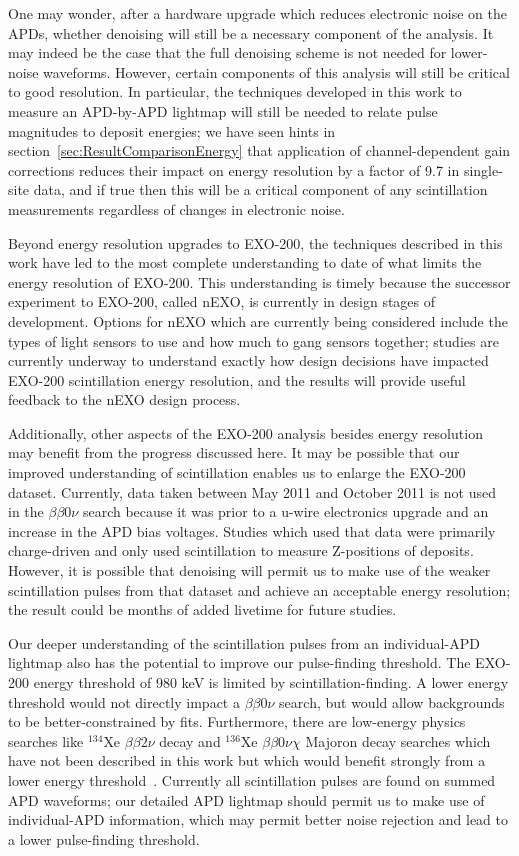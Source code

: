 One may wonder, after a hardware upgrade which reduces electronic noise on the APDs, whether denoising will still be a necessary component of the analysis.  It may indeed be the case that the full denoising scheme is not needed for lower-noise waveforms.  However, certain components of this analysis will still be critical to good resolution.  In particular, the techniques developed in this work to measure an APD-by-APD lightmap will still be needed to relate pulse magnitudes to deposit energies; we have seen hints in section~\ref{sec:ResultComparisonEnergy} that application of channel-dependent gain corrections reduces their impact on energy resolution by a factor of 9.7 in single-site data, and if true then this will be a critical component of any scintillation measurements regardless of changes in electronic noise.

Beyond energy resolution upgrades to EXO-200, the techniques described in this work have led to the most complete understanding to date of what limits the energy resolution of EXO-200.  This understanding is timely because the successor experiment to EXO-200, called nEXO, is currently in design stages of development.  Options for nEXO which are currently being considered include the types of light sensors to use and how much to gang sensors together; studies are currently underway to understand exactly how design decisions have impacted EXO-200 scintillation energy resolution, and the results will provide useful feedback to the nEXO design process.

Additionally, other aspects of the EXO-200 analysis besides energy resolution may benefit from the progress discussed here.  It may be possible that our improved understanding of scintillation enables us to enlarge the EXO-200 dataset.  Currently, data taken between May 2011 and October 2011 is not used in the $\beta\beta 0\nu$ search because it was prior to a u-wire electronics upgrade and an increase in the APD bias voltages.  Studies which used that data were primarily charge-driven and only used scintillation to measure Z-positions of deposits.  However, it is possible that denoising will permit us to make use of the weaker scintillation pulses from that dataset and achieve an acceptable energy resolution; the result could be months of added livetime for future studies.

Our deeper understanding of the scintillation pulses from an individual-APD lightmap also has the potential to improve our pulse-finding threshold.  The EXO-200 energy threshold of 980 keV is limited by scintillation-finding.  A lower energy threshold would not directly impact a $\beta\beta 0\nu$ search, but would allow backgrounds to be better-constrained by fits.  Furthermore, there are low-energy physics searches like $^{134}$Xe $\beta\beta 2\nu$ decay and $^{136}$Xe $\beta\beta 0\nu \chi$ Majoron decay searches which have not been described in this work but which would benefit strongly from a lower energy threshold~\cite{ThesisSteve}.  Currently all scintillation pulses are found on summed APD waveforms; our detailed APD lightmap should permit us to make use of individual-APD information, which may permit better noise rejection and lead to a lower pulse-finding threshold.

